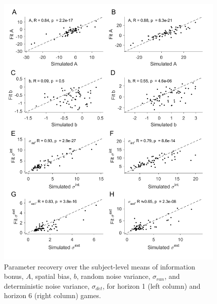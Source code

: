 \documentclass[12pt]{article}
\begin{document}
	\begin{figure}[hp]
		\begin{center}
			\includegraphics[width=1\textwidth]{figures/precover.png}
			\caption{Parameter recovery over the subject-level means of information bonus, $A$, spatial bias, $b$, random noise variance, $\sigma_{ran}$, and deterministic noise variance, $\sigma_{det}$, for horizon 1 (left column) and horizon 6 (right column) games. 
			}
			\label{fig:pararecover1}
		\end{center}
	\end{figure} 
	
\end{document}

